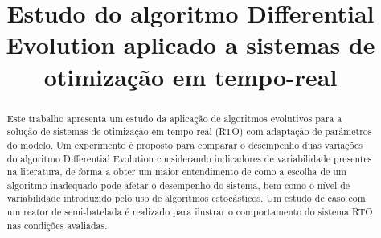 \documentclass[conference]{IEEEtran}
\begin{document}
\title{Estudo do algoritmo Differential Evolution aplicado a sistemas de otimização em tempo-real}


\author{
}





\maketitle

\begin{abstract}
Este trabalho apresenta um estudo da aplicação de algoritmos evolutivos para a solução de sistemas de otimização em tempo-real (RTO) com adaptação de parâmetros do modelo. Um experimento é proposto para comparar o desempenho duas variações do algoritmo Differential Evolution considerando indicadores de variabilidade presentes na literatura, de forma a obter um maior entendimento de como a escolha de um algoritmo inadequado pode afetar o desempenho do sistema, bem como o nível de variabilidade introduzido pelo uso de algoritmos estocásticos. Um estudo de caso com um reator de semi-batelada é realizado para ilustrar o comportamento do sistema RTO nas condições avaliadas.
\end{abstract}


%
\end{document}
